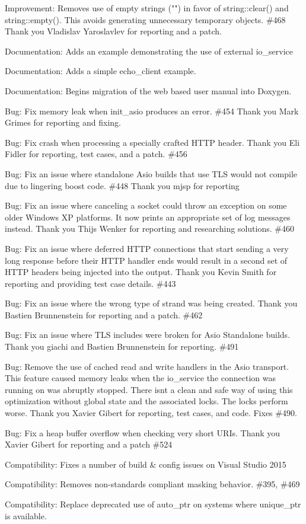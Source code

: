 \begin{DoxyItemize}
\item Improvement\+: Removes use of empty strings ("{}"{}) in favor of {\ttfamily string\+::clear()} and {\ttfamily string\+::empty()}. This avoids generating unnecessary temporary objects. \#468 Thank you Vladislav Yaroslavlev for reporting and a patch.
\item Documentation\+: Adds an example demonstrating the use of external {\ttfamily io\+\_\+service}
\item Documentation\+: Adds a simple echo\+\_\+client example.
\item Documentation\+: Begins migration of the web based user manual into Doxygen.
\item Bug\+: Fix memory leak when init\+\_\+asio produces an error. \#454 Thank you Mark Grimes for reporting and fixing.
\item Bug\+: Fix crash when processing a specially crafted HTTP header. Thank you Eli Fidler for reporting, test cases, and a patch. \#456
\item Bug\+: Fix an issue where standalone Asio builds that use TLS would not compile due to lingering boost code. \#448 Thank you mjsp for reporting
\item Bug\+: Fix an issue where canceling a socket could throw an exception on some older Windows XP platforms. It now prints an appropriate set of log messages instead. Thank you Thijs Wenker for reporting and researching solutions. \#460
\item Bug\+: Fix an issue where deferred HTTP connections that start sending a very long response before their HTTP handler ends would result in a second set of HTTP headers being injected into the output. Thank you Kevin Smith for reporting and providing test case details. \#443
\item Bug\+: Fix an issue where the wrong type of strand was being created. Thank you Bastien Brunnenstein for reporting and a patch. \#462
\item Bug\+: Fix an issue where TLS includes were broken for Asio Standalone builds. Thank you giachi and Bastien Brunnenstein for reporting. \#491
\item Bug\+: Remove the use of cached read and write handlers in the Asio transport. This feature caused memory leaks when the io\+\_\+service the connection was running on was abruptly stopped. There isn\textquotesingle{}t a clean and safe way of using this optimization without global state and the associated locks. The locks perform worse. Thank you Xavier Gibert for reporting, test cases, and code. Fixes \#490.
\item Bug\+: Fix a heap buffer overflow when checking very short URIs. Thank you Xavier Gibert for reporting and a patch \#524
\item Compatibility\+: Fixes a number of build \& config issues on Visual Studio 2015
\item Compatibility\+: Removes non-\/standards compliant masking behavior. \#395, \#469
\item Compatibility\+: Replace deprecated use of auto\+\_\+ptr on systems where unique\+\_\+ptr is available.
\end{DoxyItemize}

